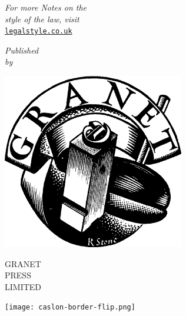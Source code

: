 \documentclass[11pt,a4paper]{article}
\renewcommand{\textcsc}[1]{\textsc{\cscshape #1}}
\begin{document}

\begin{center}
	
\footnotesize\textit{For more Notes on the}\\
\footnotesize\textit{ style of the law, visit}\\
\normalfont\href{https://www.legalstyle.co.uk/}{\footnotesize\texttt{legalstyle.co.uk}}
\end{center}

\begin{center}
\scriptsize \textit{Published}
%
%
\\
\textit{by}

\vspace*{12pt}


\includegraphics[width=.5in]{img/rs-Granet.png}

\footnotesize
\gplogo\MakeUppercase{Granet\\Press}\\
\normalfont\scriptsize\textcsc{LIMITED}
\end{center}
\begin{center}
\texttt{[image: caslon-border-flip.png]}
\end{center}
\vfill
\end{document}
